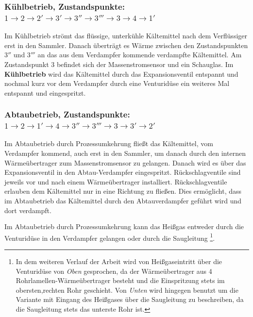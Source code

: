 \subsubsection{Kühlbetrieb, Zustandspunkte: $1 \rightarrow 2 \rightarrow 2'\rightarrow 3' \rightarrow 3''\rightarrow  3''' \rightarrow 3 \rightarrow 4 \rightarrow 1' $}

Im Kühlbetrieb strömt das flüssige, unterkühle Kältemittel nach dem Verflüssiger erst in den Sammler. Danach überträgt es Wärme zwischen den Zustandspunkten $3''$ und $3'''$ an das aus dem Verdampfer kommende verdampfte Kältemittel. Am Zustandspunkt $3$ befindet sich der Massenstromsensor und ein Schauglas.  
Im \textbf{Kühlbetrieb} wird das Kältemittel durch das Expansionsventil entspannt und nochmal kurz vor dem Verdampfer durch eine Venturidüse ein weiteres Mal entspannt und eingespritzt.

\subsubsection*{Abtaubetrieb, Zustandspunkte: $1 \rightarrow 2 \rightarrow 1'\rightarrow 4 \rightarrow 3''\rightarrow  3''' \rightarrow 3 \rightarrow 3' \rightarrow 2' $}

Im Abtaubetrieb durch Prozessumkehrung fließt das Kältemittel, vom Verdampfer kommend, auch erst in den Sammler, um danach durch den internen Wärmeübertrager zum Massenstromsensor zu gelangen. Danach wird es über das Expansionsventil in den Abtau-Verdampfer eingespritzt. Rückschlagventile sind jeweils vor und nach einem Wärmeübertrager installiert. Rückschlagventile erlauben dem Kältemittel nur in eine Richtung zu fließen. Dies ermöglicht, dass im Abtaubetrieb das Kältemittel durch den Abtauverdampfer geführt wird und dort verdampft. 

Im Abtaubetrieb durch Prozessumkehrung kann das Heißgas entweder durch die Venturidüse in den Verdampfer gelangen oder durch die Saugleitung \footnote{In dem weiteren Verlauf der Arbeit wird von Heißgaseintritt über die Venturidüse von \textit{Oben} gesprochen, da der Wärmeübertrager aus 4 Rohrlamellen-Wärmeübertrager besteht und die Einspritzung stets im obersten,rechten  Rohr geschieht. Von \textit{Unten} wird hingegen benutzt um die Variante mit Eingang des Heißgases über die Saugleitung zu beschreiben, da die Saugleitung stets das unterste Rohr ist.}.  









